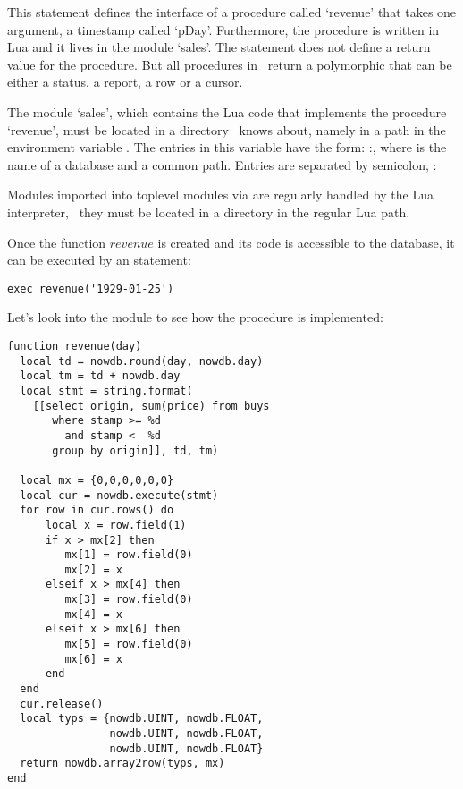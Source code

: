 This statement defines the interface of a procedure
called `revenue' that takes one argument, a timestamp
called `pDay'.
Furthermore, the procedure is written in Lua and
it lives in the module `sales'.
The statement does not define a return value for the procedure.
But all procedures in \nowdb\ return a
polymorphic  that
can be either a status, a report, a row or a cursor.

The  module `sales',
which contains the Lua code that implements
the procedure `revenue',
must be located in a directory
\nowdb\ knows about, namely 
in a path in the environment variable
.
The entries in this variable have the form:
:,
where  is the name of a database
and  a common  path.
Entries are separated by semicolon, \eg:


Modules imported into toplevel modules via 
are regularly handled by the Lua interpreter, \ie\
they must be located in a directory in the regular
Lua path.

Once the function $revenue$ is created
and its code is accessible to the database, it
can be executed by an  statement:

\begin{sqlcode}
\begin{lstlisting}
exec revenue('1929-01-25')
\end{lstlisting}
\end{sqlcode}

\begin{minipage}{\textwidth}
Let's look into the module 
to see how the procedure is implemented:

\begin{lua}
\begin{lstlisting}
function revenue(day)
  local td = nowdb.round(day, nowdb.day)
  local tm = td + nowdb.day
  local stmt = string.format(
    [[select origin, sum(price) from buys
       where stamp >= %d
         and stamp <  %d
       group by origin]], td, tm)

  local mx = {0,0,0,0,0,0}
  local cur = nowdb.execute(stmt)
  for row in cur.rows() do
      local x = row.field(1)
      if x > mx[2] then
         mx[1] = row.field(0)
         mx[2] = x
      elseif x > mx[4] then
         mx[3] = row.field(0)
         mx[4] = x
      elseif x > mx[6] then 
         mx[5] = row.field(0)
         mx[6] = x
      end
  end
  cur.release()
  local typs = {nowdb.UINT, nowdb.FLOAT,
                nowdb.UINT, nowdb.FLOAT,
                nowdb.UINT, nowdb.FLOAT}
  return nowdb.array2row(typs, mx)
end
\end{lstlisting}
\end{lua}
\end{minipage}

